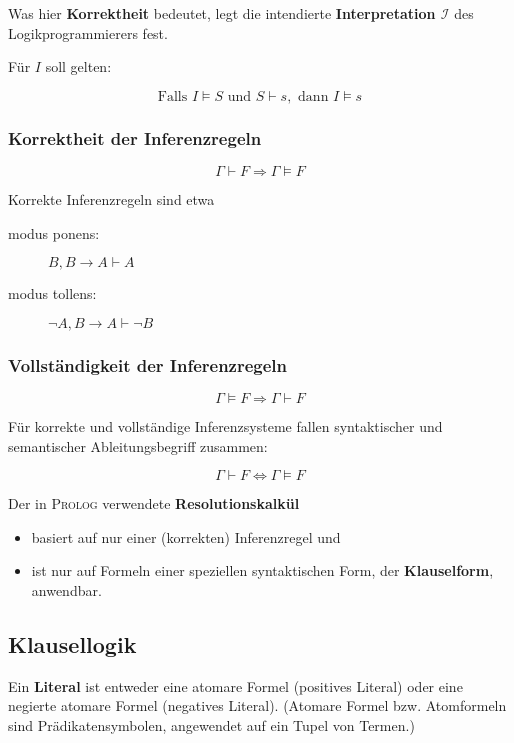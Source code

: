 \documentclass[runningheads,deutsch]{llncs}
\begin{document}
\parindent0mm
Was hier \textbf{Korrektheit} bedeutet, legt die intendierte \textbf{Interpretation  $\mathcal I$} des Logikprogrammierers fest.

\parindent5mm

Für $I$ soll gelten:

\[ \text{Falls } I \vDash S \text{ und } S \vdash s, \text{ dann } I \vDash s \]

\subsubsection{Korrektheit der Inferenzregeln}
\[ \Gamma \vdash F \Rightarrow \Gamma \vDash F \]

\parindent 0mm
Korrekte Inferenzregeln sind etwa
\begin{description}
    \item[modus ponens:] $B, B \rightarrow A \vdash A$
    \item[modus tollens:] $\lnot A, B \rightarrow A \vdash \lnot B$ 
\end{description}

\subsubsection{Vollständigkeit der Inferenzregeln}
\[ \Gamma \vDash F \Rightarrow \Gamma \vdash F \]

\parindent0mm
Für korrekte und vollständige Inferenzsysteme fallen syntaktischer und semantischer Ableitungsbegriff zusammen:

\[ \Gamma \vdash F \Leftrightarrow \Gamma \vDash F \]

Der in \textsc{Prolog} verwendete \textbf{Resolutionskalkül}
\begin{itemize}
    \item basiert auf nur einer (korrekten) Inferenzregel und
    \item ist nur auf Formeln einer speziellen syntaktischen Form, der \textbf{Klauselform}, anwendbar.
\end{itemize}

\subsection{Klausellogik}

Ein \textbf{Literal} ist entweder eine atomare Formel (positives Literal) oder eine negierte atomare Formel (negatives Literal). (Atomare Formel bzw. Atomformeln sind Prädikatensymbolen, angewendet auf ein Tupel von Termen.)
\end{document}
